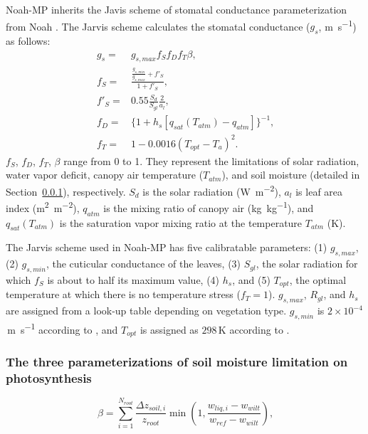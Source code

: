 \documentclass[essd]{copernicus}
\begin{document}
Noah-MP inherits the Javis scheme \citep{jarvis1976PTRSLBBS} of stomatal
conductance parameterization from Noah \citep{chen2001MWR}. The Jarvis scheme
calculates the stomatal conductance (\(g_s\), \si{m~s^{-1}}) as follows:
\begin{align}
  g_s =    & g_{s,max} f_{S} f_{D} f_{T} \beta \text{,} \\
  f_{S} =  & \frac{\frac{g_{s,min}}{g_{s,max}}+f'_{S}}{1+f'_{S}} \text{,} \\
  f'_{S} = & 0.55 \frac{S_d}{S_{gl}} \frac{2}{a_l} \text{,} \\
  f_{D} =  & \{1+h_s[q_{sat}(T_{atm})-q_{atm}]\}^{-1} \text{,} \\
  f_{T} =  & 1- 0.0016 (T_{opt} - T_a)^2 \text{.}
\end{align}
\(f_{S}\), \(f_{D}\), \(f_{T}\), \(\beta\) range from 0 to 1. They represent the
limitations of solar radiation, water vapor deficit, canopy air temperature
(\(T_{atm}\)), and soil moisture (detailed in
Section~\ref{sec:data:noahmp:beta}), respectively. \(S_d\) is the solar
radiation (\si{W~m^{-2}}), \(a_l\) is leaf area index (\si{m^2~m^{-2}}),
\(q_{atm}\) is the mixing ratio of canopy air (\si{kg~kg^{-1}}), and
\(q_{sat}(T_{atm})\) is the saturation vapor mixing ratio at the temperature
\(T_{atm}\) (\si{K}).

The Jarvis scheme used in Noah-MP has five calibratable parameters: (1)
\(g_{s,max}\), (2) \(g_{s,min}\), the cuticular conductance of the leaves, (3)
\(S_{gl}\), the solar radiation for which \(f_{S}\) is about to half its maximum
value, (4) \(h_s\), and (5) \(T_{opt}\), the optimal temperature at which there
is no temperature stress (\(f_{T}=1\)). \(g_{s,max}\), \(R_{gl}\), and \(h_s\)
are assigned from a look-up table depending on vegetation type. \(g_{s,min}\) is
\(2\times10^{-4}\)\,\si{m~s^{-1}} according to \citet{dickinson1993}, and
\(T_{opt}\) is assigned as \(298\)\,\si{K} according to \citet{noilhan1989MWR}.

\subsubsection{The three parameterizations of soil moisture limitation on
  photosynthesis}\label{sec:data:noahmp:beta}

\begin{equation}
  \beta = \sum_{i=1}^{N_{root}} \frac{\Delta z_{soil,i}}{z_{root}}
  \min\left(1, \frac{w_{liq,i} - w_{wilt}}{w_{ref} - w_{wilt}}\right)
  \text{,}
\end{equation}
\end{document}
